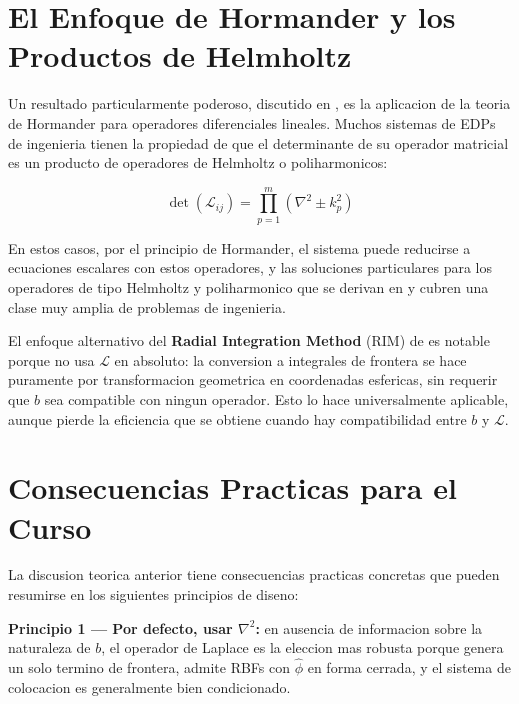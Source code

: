 \documentclass[12pt,a4paper]{article}
\begin{document}
\section{El Enfoque de Hormander y los Productos de Helmholtz}

Un resultado particularmente poderoso, discutido en \cite{tsai2009splines}, es
la aplicacion de la teoria de Hormander para operadores diferenciales lineales.
Muchos sistemas de EDPs de ingenieria tienen la propiedad de que el determinante
de su operador matricial es un producto de operadores de Helmholtz o
poliharmonicos:

\begin{equation}
    \det(\mathcal{L}_{ij}) = \prod_{p=1}^{m}(\nabla^2 \pm k_p^2)
\end{equation}

En estos casos, por el principio de Hormander, el sistema puede reducirse a
ecuaciones escalares con estos operadores, y las soluciones particulares para
los operadores de tipo Helmholtz y poliharmonico que se derivan en
\cite{muleshkov2007multihelmholtz} y \cite{tsai2009splines} cubren una clase
muy amplia de problemas de ingenieria.

El enfoque alternativo del \textbf{Radial Integration Method} (RIM) de
\cite{gao2002rim} es notable porque no usa $\mathcal{L}$ en absoluto: la
conversion a integrales de frontera se hace puramente por transformacion
geometrica en coordenadas esfericas, sin requerir que $b$ sea compatible con
ningun operador. Esto lo hace universalmente aplicable, aunque pierde la
eficiencia que se obtiene cuando hay compatibilidad entre $b$ y $\mathcal{L}$.

\section{Consecuencias Practicas para el Curso}

La discusion teorica anterior tiene consecuencias practicas concretas que
pueden resumirse en los siguientes principios de diseno:

\textbf{Principio 1 --- Por defecto, usar $\nabla^2$:} en ausencia de
informacion sobre la naturaleza de $b$, el operador de Laplace es la eleccion
mas robusta porque genera un solo termino de frontera, admite RBFs con
$\hat{\phi}$ en forma cerrada, y el sistema de colocacion es generalmente
bien condicionado.
\end{document}
